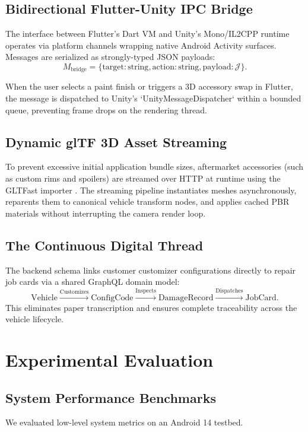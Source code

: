 \documentclass[10pt,journal,compsoc]{IEEEtran}
\begin{document}
\subsection{Bidirectional Flutter-Unity IPC Bridge}
The interface between Flutter's Dart VM and Unity's Mono/IL2CPP runtime operates via platform channels wrapping native Android Activity surfaces. Messages are serialized as strongly-typed JSON payloads:
\begin{equation}
    M_{\text{bridge}} = \{ \text{target}: \text{string}, \text{action}: \text{string}, \text{payload}: \mathcal{J} \}.
\end{equation}

When the user selects a paint finish or triggers a 3D accessory swap in Flutter, the message is dispatched to Unity's `UnityMessageDispatcher` within a bounded queue, preventing frame drops on the rendering thread.

\subsection{Dynamic glTF 3D Asset Streaming}
To prevent excessive initial application bundle sizes, aftermarket accessories (such as custom rims and spoilers) are streamed over HTTP at runtime using the GLTFast importer \cite{gltf2020khronos}. The streaming pipeline instantiates meshes asynchronously, reparents them to canonical vehicle transform nodes, and applies cached PBR materials without interrupting the camera render loop.

\subsection{The Continuous Digital Thread}
The backend schema links customer customizer configurations directly to repair job cards via a shared GraphQL domain model:
\begin{equation}
    \text{Vehicle} \xrightarrow{\text{Customizes}} \text{ConfigCode} \xrightarrow{\text{Inspects}} \text{DamageRecord} \xrightarrow{\text{Dispatches}} \text{JobCard}.
\end{equation}
This eliminates paper transcription and ensures complete traceability across the vehicle lifecycle.

\section{Experimental Evaluation}

\subsection{System Performance Benchmarks}
We evaluated low-level system metrics on an Android 14 testbed.
\end{document}
